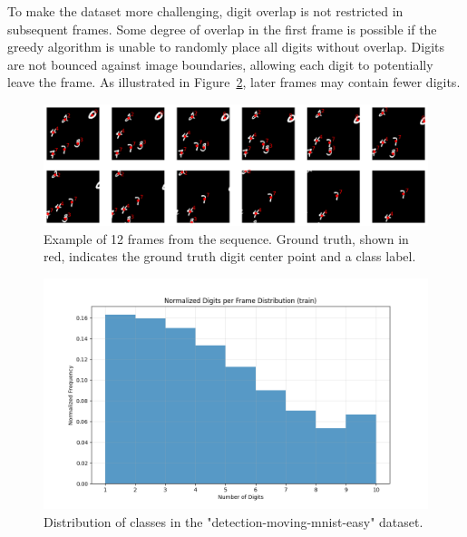To make the dataset more challenging, digit overlap is not restricted in subsequent frames. Some degree of overlap in the first frame is possible if the greedy algorithm is unable to randomly place all digits without overlap. Digits are not bounced against image boundaries, allowing each digit to potentially leave the frame. As illustrated in Figure~\ref{fig:figure_method_dataset_train_digits_per_frame}, later frames may contain fewer digits.

\begin{figure}
    \centering
    \includegraphics[width=\textwidth]{figures/figure_methods_dataset_detection_mmnist_sequence.png}
    \caption{Example of 12 frames from the sequence. Ground truth, shown in red, indicates the ground truth digit center point and a class label.}
    \label{fig:figure_methods_dataset_detection_mmnist_sequence}
\end{figure}

\begin{figure}
    \centering
    \includegraphics[width=\textwidth]{figures/figure_method_dataset_train_digits_per_frame.png}
    \caption{Distribution of classes in the "detection-moving-mnist-easy" dataset.}
    \label{fig:figure_method_dataset_train_digits_per_frame}
\end{figure}

